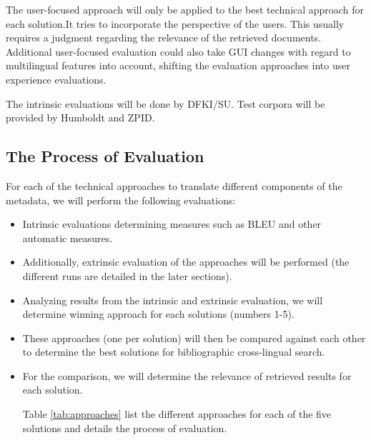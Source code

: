 \documentclass[a4paper,11pt]{article}
\begin{document}
The user-focused approach will only be applied to the best technical approach for each solution.It tries to incorporate the perspective of the users. This usually requires a judgment regarding the relevance of the retrieved documents. Additional user-focused evaluation could also take GUI changes with regard to multilingual features into account, shifting the evaluation approaches into user experience evaluations. 

The intrinsic evaluations will be done by DFKI/SU. Test corpora will be provided by Humboldt and ZPID. 

\subsection{The Process of Evaluation}

For each of the technical approaches to translate different components of the metadata, we will perform the following evaluations:
\begin{itemize}
\item Intrinsic evaluations determining measures such as BLEU and other automatic measures.
\item Additionally, extrinsic evaluation of the approaches will be performed (the different runs are detailed in the later sections).
\item Analyzing results from the intrinsic and extrinsic evaluation, we will determine winning approach for each solutions (numbers 1-5).
\item  These approaches (one per solution) will then be compared against each other to determine the best solutions for bibliographic cross-lingual search.
\item For the comparison, we will determine the relevance of retrieved results for each solution.

Table \ref{tab:approaches} list the different approaches for each of the five solutions and details the process of evaluation.
\end{itemize}
\end{document}
